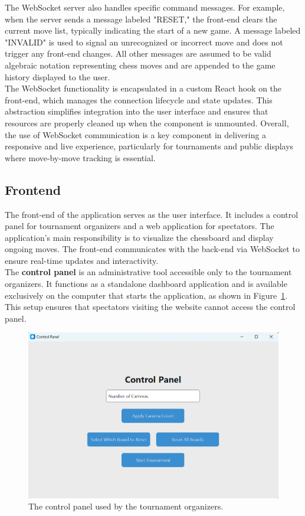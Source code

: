 The WebSocket server also handles specific command messages. For example, when the server sends a message labeled "RESET," the front-end clears the current move list, typically indicating the start of a new game. A message labeled "INVALID" is used to signal an unrecognized or incorrect move and does not trigger any front-end changes. All other messages are assumed to be valid algebraic notation representing chess moves and are appended to the game history displayed to the user. \\

The WebSocket functionality is encapsulated in a custom React hook on the front-end, which manages the connection lifecycle and state updates. This abstraction simplifies integration into the user interface and ensures that resources are properly cleaned up when the component is unmounted. Overall, the use of WebSocket communication is a key component in delivering a responsive and live experience, particularly for tournaments and public displays where move-by-move tracking is essential.

\subsection{Frontend}
The front-end of the application serves as the user interface. It includes a control panel for tournament organizers and a web application for spectators. The application's main responsibility is to visualize the chessboard and display ongoing moves. The front-end communicates with the back-end via WebSocket to ensure real-time updates and interactivity. \\

The \textbf{control panel} is an administrative tool accessible only to the tournament organizers. It functions as a standalone dashboard application and is available exclusively on the computer that starts the application, as shown in Figure~\ref{fig:control-panel}. This setup ensures that spectators visiting the website cannot access the control panel. \\

\begin{figure}[h!] \centering \includegraphics[width=0.75\linewidth]{figures/results/frontend/controlpanel.png} \caption[Control panel for tournament organizers]{The control panel used by the tournament organizers.}\label{fig:control-panel} \end{figure}

